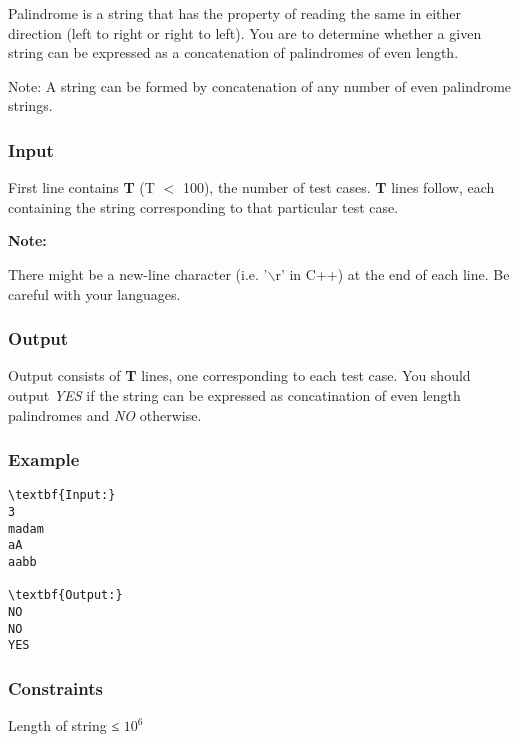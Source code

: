 







   Palindrome is a string that has the property of reading the same in either direction (left to right or right to left). You are to determine whether a given string can be expressed as a concatenation of palindromes of even length.  

   Note: A string can be formed by concatenation of any number of even palindrome strings.  

\subsubsection{   Input  }

   First line contains   \textbf{    T   }   (T $<$ 100), the number of test cases.   \textbf{    T   }   lines follow, each containing the string corresponding to that particular test case.  

\textbf{    Note:   }

   There might be a new-line character (i.e. '$\backslash$r' in C++) at the end of each line. Be careful with your languages.  

\subsubsection{   Output  }

   Output consists of   \textbf{    T   }   lines, one corresponding to each test case. You should output   \emph{    YES   }   if the string can be expressed as concatination of even length palindromes and   \emph{    NO   }   otherwise.  

\subsubsection{   Example  }
\begin{verbatim}
\textbf{Input:}
3
madam
aA
aabb

\textbf{Output:}
NO
NO
YES 
\end{verbatim}

\subsubsection{   Constraints  }

   Length of string ≤ $10^{6}$

